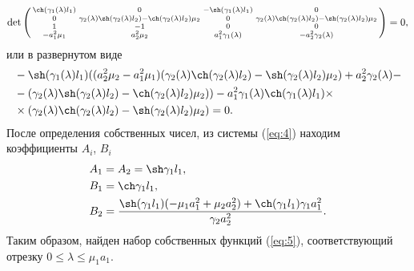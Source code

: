 \documentclass[12pt, a4paper, draft]{article}
\begin{document}
\begin{equation}
  \det \left(  
  \begin{smallmatrix}
    \ch(\gamma_1(\lambda) l_1) & 0 & -\sh(\gamma_1(\lambda) l_1) & 0 \\
    0 & \gamma_2(\lambda) \sh(\gamma_2(\lambda) l_2)-\ch(\gamma_2(\lambda) l_2) \mu_2 & 0 & \gamma_2(\lambda) \ch(\gamma_2(\lambda) l_2)-\sh(\gamma_2(\lambda) l_2) \mu_2 \\
    1 & -1 & 0 & 0 \\
    -a_1^2 \mu_1 & a_2^2 \mu_2 & a_1^2 \gamma_1(\lambda) & -a_2^2 \gamma_2(\lambda) \\
  \end{smallmatrix}
  \right) = 0,
\end{equation}
или в развернутом виде
\begin{equation}
  \begin{aligned}
  & -\sh(\gamma_1(\lambda) l_1) ((a_2^2 \mu_2-a_1^2 \mu_1) (\gamma_2(\lambda) \ch(\gamma_2(\lambda) l_2)-\sh(\gamma_2(\lambda) l_2) \mu_2)+a_2^2 \gamma_2(\lambda)- \\
  & -(\gamma_2(\lambda) \sh(\gamma_2(\lambda) l_2)-\ch(\gamma_2(\lambda) l_2) \mu_2))-a_1^2 \gamma_1(\lambda) \ch(\gamma_1(\lambda) l_1) \times \\
  & \times (\gamma_2(\lambda) \ch(\gamma_2(\lambda) l_2)-\sh(\gamma_2(\lambda) l_2) \mu_2) = 0.
  \end{aligned}
  \label{eq:19}
\end{equation}
После определения собственных чисел, из системы (\ref{eq:4}) находим коэффициенты $A_i$, $B_i$
\begin{equation}
  \begin{aligned}
    & A_1 = A_2 = \sh \gamma_1l_1, \\
    & B_1 = \ch \gamma_1l_1, \\
    & B_2 = \frac{\sh (\gamma_1l_1) (-\mu_1 a_1^2 + \mu_2 a_2^2) + \ch (\gamma_1l_1) \gamma_1 a_1^2}{\gamma_2a_2^2}.
  \end{aligned}
\end{equation}
Таким образом, найден набор собственных функций (\ref{eq:5}), соответствующий отрезку $ 0 \le \lambda \le \mu_1a_1 $.
\end{document}
